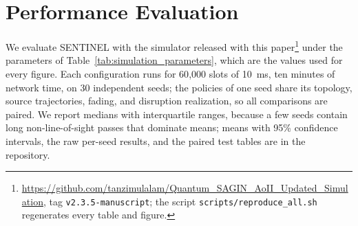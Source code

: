 \section{Performance Evaluation}
\label{sec:performance}

We evaluate SENTINEL with the simulator released with this paper\footnote{\url{https://github.com/tanzimulalam/Quantum_SAGIN_AoII_Updated_Simulation}, tag \texttt{v2.3.5-manuscript}; the script \texttt{scripts/reproduce\_all.sh} regenerates every table and figure.}
under the parameters of Table~\ref{tab:simulation_parameters}, which are the values used for every figure. Each
configuration runs for 60{,}000 slots of 10~ms, ten minutes of network time, on 30 independent seeds; the policies of
one seed share its topology, source trajectories, fading, and disruption realization, so all comparisons are paired.
We report medians with interquartile ranges, because a few seeds contain long non-line-of-sight passes that dominate
means; means with 95\% confidence intervals, the raw per-seed results, and the paired test tables are in the
repository.

